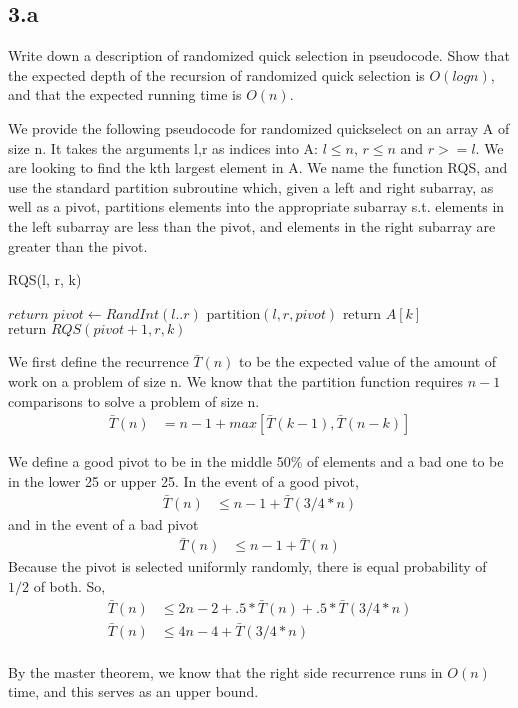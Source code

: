 \documentclass[11pt]{article}
\begin{document}



\subsection *{3.a}
Write down a description of randomized quick selection in pseudocode. Show that the expected depth of the recursion of randomized quick selection is $O(log n)$, and that the
expected running time is $O(n)$.

\begin{solution}

We provide the following pseudocode for randomized quickselect on an array A of size n. It takes the arguments l,r as indices into A: $l \leq n$, $r \leq n$ and $r >= l$. We are looking to find the kth largest element in A. We name the function RQS, and use the standard partition subroutine which, given a left and right subarray, as well as a pivot, partitions elements into the appropriate subarray s.t. elements in the left subarray are less than the pivot, and elements in the right subarray are greater than the pivot.
\begin{algorithm}
\caption{RQS(l, r, k)}
\begin{algorithmic}
\STATE $return$
\ENDIF
\STATE $pivot \gets RandInt(l..r)$
\STATE $\text{partition}(l,r,pivot)$
\STATE $\text{return } A[k]$
\ELSE
\STATE $\text{return } RQS(pivot+1, r, k)$
\ENDIF
\end{algorithmic}
\end{algorithm}

We first define the recurrence $\bar{T}(n)$ to be the expected value of the amount of work on a problem of size n. We know that the partition function requires $n-1$ comparisons to solve a problem of size n.
\begin{align*}
\bar{T}(n) &= n - 1 + max[\bar{T}(k-1), \bar{T}(n-k)]
\end{align*}

We define a good pivot to be in the middle 50\% of elements and a bad one to be in the lower 25 or upper 25.  In the event of a good pivot,
\begin{align*}
\bar{T}(n) &\leq n - 1 + \bar{T}(3/4 * n)
\end{align*}
and in the event of a bad pivot
\begin{align*}
\bar{T}(n) &\leq n - 1 + \bar{T}(n)
\end{align*}
Because the pivot is selected uniformly randomly, there is equal probability of $1/2$ of both. So,
\begin{align*}
\bar{T}(n) &\leq 2n - 2 + .5*\bar{T}(n) + .5*\bar{T}(3/4 * n) \\
\bar{T}(n) &\leq 4n - 4 + \bar{T}(3/4 * n)
\end{align*}
\\ By the master theorem, we know that the right side recurrence runs in $O(n)$ time, and this serves as an upper bound.
\\


\end{solution}
\end{document}
